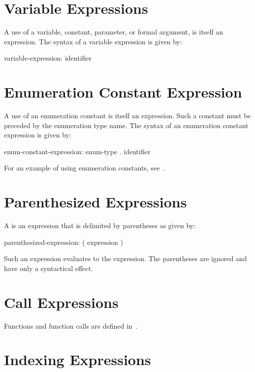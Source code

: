 \section{Variable Expressions}
\label{Variable_Expressions}

A use of a variable, constant, parameter, or formal argument, is
itself an expression.  The syntax of a variable expression is given
by:
\begin{syntax}
variable-expression:
  identifier
\end{syntax}

\section{Enumeration Constant Expression}
\label{Enumeration_Constant_Expression}

A use of an enumeration constant is itself an expression.  Such a
constant must be preceded by the enumeration type name.  The syntax of
an enumeration constant expression is given by:
\begin{syntax}
enum-constant-expression:
  enum-type . identifier
\end{syntax}

For an example of using enumeration constants,
see~.

\section{Parenthesized Expressions}
\label{Parenthesized_Expressions}

A  is an expression that is delimited
by parentheses as given by:
\begin{syntax}
parenthesized-expression:
  ( expression )
\end{syntax}
Such an expression evaluates to the expression.  The parentheses are
ignored and have only a syntactical effect.

\section{Call Expressions}
\label{Call_Expressions}

Functions and function calls are defined in~.

\section{Indexing Expressions}
\label{Indexing_Expressions}

